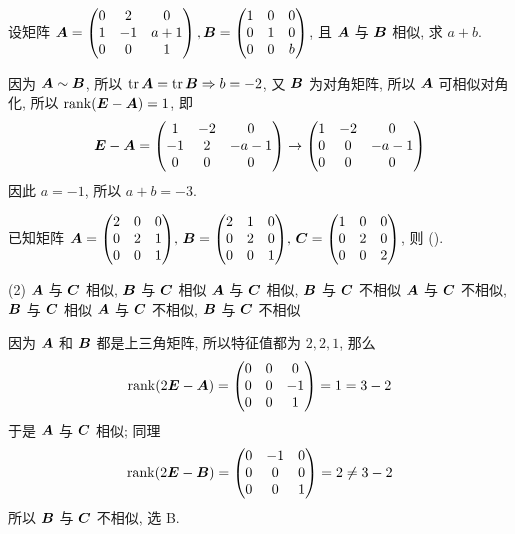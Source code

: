 \begin{example}
    设矩阵 $\vb*{A}=\begin{pmatrix} 0 & 2 & 0 \\ 1 & -1 & a+1 \\ 0 & 0 & 1 \\\end{pmatrix}, \vb*{B}=\begin{pmatrix} 1 & 0 & 0 \\ 0 & 1 & 0 \\ 0 & 0 & b \\\end{pmatrix}$, 且 $\vb*{A}$ 与 $\vb*{B}$ 相似, 求 $a+b.$
\end{example}
\begin{solution}
    因为 $\vb*{A}\sim \vb*{B}$, 所以 $\tr\vb*{A}=\tr\vb*{B}\Rightarrow b=-2$, 又 $\vb*{B}$ 为对角矩阵, 所以 $\vb*{A}$ 可相似对角化, 所以 $\rank(\vb*{E}-\vb*{A})=1$, 即
    $$
        \vb*{E}-\vb*{A}=\begin{pmatrix} 1 & -2 & 0 \\ -1 & 2 & -a-1 \\ 0 & 0 & 0 \\\end{pmatrix}\to \begin{pmatrix} 1 & -2 & 0 \\ 0 & 0 & -a-1 \\ 0 & 0 & 0 \\\end{pmatrix}
    $$
    因此 $a=-1$, 所以 $a+b=-3.$
\end{solution}

\begin{example}[2017 数一]
    已知矩阵 $\vb*{A}=\mqty(2&0&0\\0&2&1\\0&0&1)\text{, }\vb*{B}=\mqty(2&1&0\\0&2&0\\0&0&1)\text{, }\vb*{C}=\mqty(1&0&0\\0&2&0\\0&0&2)$, 则 (\quad).
    \begin{tasks}(2)
        \task $\vb*{A}$ 与 $\vb*{C}$ 相似, $\vb*{B}$ 与 $\vb*{C}$ 相似
        \task $\vb*{A}$ 与 $\vb*{C}$ 相似, $\vb*{B}$ 与 $\vb*{C}$ 不相似
        \task $\vb*{A}$ 与 $\vb*{C}$ 不相似, $\vb*{B}$ 与 $\vb*{C}$ 相似
        \task $\vb*{A}$ 与 $\vb*{C}$ 不相似, $\vb*{B}$ 与 $\vb*{C}$ 不相似
    \end{tasks}
\end{example}
\begin{solution}
    因为 $\vb*{A}$ 和 $\vb*{B}$ 都是上三角矩阵, 所以特征值都为 $2,2,1$, 那么 $$\rank(2\vb*{E}-\vb*{A})=\mqty(0&0&0\\0&0&-1\\0&0&1)=1=3-2$$
    于是 $\vb*{A}$ 与 $\vb*{C}$ 相似; 同理 $$\rank(2\vb*{E}-\vb*{B})=\mqty(0&-1&0\\0&0&0\\0&0&1)=2\neq3-2$$
    所以 $\vb*{B}$ 与 $\vb*{C}$ 不相似, 选 B.
\end{solution}

